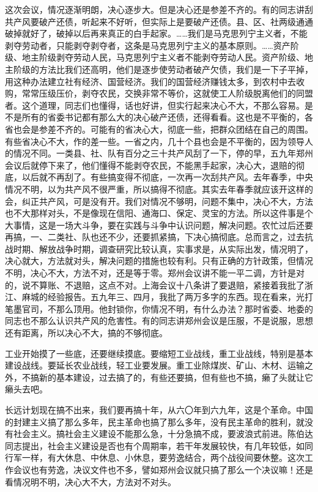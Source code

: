 这次会议，情况逐渐明朗，决心逐步大。但是决心还是参差不齐的。有的同志讲刮共产风要破产还债，听起来不好听，但实际上是要破产还债。县、区、社两级通通破掉就好了，破掉以后再来真正的白手起家。……我们是马克思列宁主义者，不能剥夺劳动者，只能剥夺剥夺者，这条是马克思列宁主义的基本原则。……资产阶级、地主阶级剥夺劳动人民，马克思列宁主义者不能剥夺劳动人民。资产阶级、地主阶级的方法比我们还高明，他们是逐步使劳动者破产欠债，我们是一下子平掉，用这种办法建立社有经济、国营经济。我们的国营经济赚钱太多，到农村中去收购，常常压级压价，剥夺农民，交换非常不等价，这就使工人阶级脱离他们的同盟者。这个道理，同志们也懂得，话也好讲，但实行起来决心不大，不那么容易。是不是所有的省委书记都有那么大的决心破产还债，还得看看。这也是不平衡的，各省也会是参差不齐的。可能有的省决心大，彻底一些，把群众团结在自己的周围。有些省决心不大，作的差一些。一省之内，几十个县也会是不平衡的，因为领导人的情况不同。一类县、社、队有百分之三十共产风刮了一下，停的早，五九年郑州会议后就停下来了，他们懂得不能剥夺农民，不能黑手起家，决心大，退赔的彻底，以后就不再刮了。有些搞变得不彻底，一次再一次刮共产风。去年春季，中央情况不明，以为共产风不很严重，所以搞得不彻底。其实去年春季就应该开这样的会，纠正共产风，可是没有开。我们对情况不够明，问题不集中，决心不大，方法也不大那样对头，不是像现在信阳、通海口、保定、灵宝的方法。所以这件事是个大事情，这是一场大斗争，要在实践与斗争中认识问题，解决问题。农忙过后还要再搞，一、二类社、队也还不少，还要抓紧搞，下决心搞彻底。总而言之，过去抗战时期、解放战争时期，调查研究比较认真，实事求是，从实际出发，情况明了，决心就大，方法就对头，解决问题的措施也较有利。只有正确的方针政策，但情况不明，决心不大，方法不对，还是等于零。郑州会议讲不能一平二调，方针是对的，说不算账、不退赔，这点不对。上海会议十八条讲了要退赔，紧接着我批了浙江、麻城的经验报告。五九年三、四月，我批了两万多字的东西。现在看来，光打笔墨官司，不那么顶用。他封锁你，你情况不明，有什么办法？那时省委、地委的同志也不那么认识共产风的危害性。有的同志讲郑州会议是压服，不是说服，思想还有距离，所以决心不大，搞的不够彻底。

工业开始摸了一些底，还要继续摸底。要缩短工业战线，重工业战线，特别是基本建设战线。要延长农业战线，轻工业要发展。重工业除煤炭、矿山、木材、运输之外，不搞新的基本建设，过去搞了的，有些还要搞，但有些也不搞，癞了头就让它癞头去吧。

长远计划现在搞不出来，我们要再搞十年，从六〇年到六九年，这是个革命。中国的封建主义搞了那么多年，民主革命也搞了那么多年，没有民主革命的胜利，就没有社会主义。搞社会主义建设不能那么急，十分急搞不成，要波浪式前进。陈伯达同志提出，社会主义建设是否也有个周期率，若干年发展较快，有几年较低，如同行军一样，有大休息、中休息、小休息，要劳逸结合，两个战役间要休整。这次工作会议也有劳逸，决议文件也不多，譬如郑州会议就只搞了那么一个决议嘛！还是看情况明不明，决心大不大，方法对不对头。

